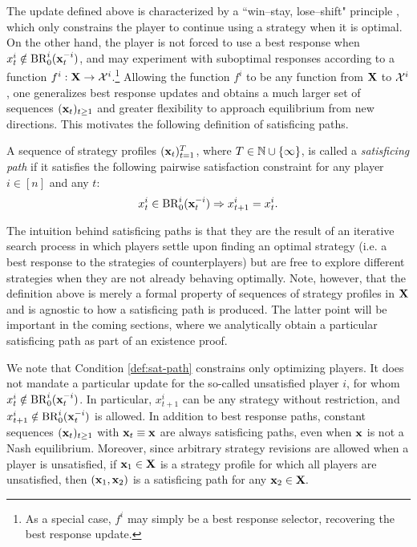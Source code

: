 The update defined above is characterized by a ``win--stay, lose--shift" principle \cite{chasparis2013aspiration, posch1999win}, which only constrains the player to continue using a strategy when it is optimal. On the other hand, the player is not forced to use a best response when $x^i_t \notin {\rm BR}^i_0 ( {\mathbf{x}}^{-i}_t )$, and may experiment with suboptimal responses according to a function $f^i : {\mathbf{X}} \to \mathcal{X}^i$.\footnote{As a special case, $f^i$ may simply be a best response selector, recovering the best response update.} Allowing the function $f^i$ to be any function from ${\mathbf{X}}$ to $\mathcal{X}^i$, one generalizes best response updates and obtains a much larger set of sequences $({\mathbf{x}}_t)_{t \geq 1}$ and greater flexibility to approach equilibrium from new directions. This motivates the following definition of satisficing paths.

\begin{definition}
    A sequence of strategy profiles $( {\mathbf{x}}_t )_{t = 1}^T$, where $T \in \mathbb{N} \cup \{ \infty\}$, is called a \emph{satisficing path} if it satisfies the following pairwise satisfaction constraint for any player $i \in [n]$ and any $t$:
        \begin{equation}
        x^i_t \in {\rm BR}^i_{0} ( {\mathbf{x}}^{-i}_t ) \Rightarrow x^i_{t+1} = x^i_t .  \label{def:sat-path}
        \end{equation}
\end{definition}

The intuition behind satisficing paths is that they are the result of an iterative search process in which players settle upon finding an optimal strategy (i.e. a best response to the strategies of counterplayers) but are free to explore different strategies when they are not already behaving optimally.  Note, however, that the definition above is merely a formal property of sequences of strategy profiles in ${\mathbf{X}}$ and is agnostic to how a satisficing path is produced. The latter point will be important in the coming sections, where we analytically obtain a particular satisficing path as part of an existence proof.



We note that Condition \eqref{def:sat-path} constrains only optimizing players. It does not mandate a particular update for the so-called unsatisfied player $i$, for whom $x^i_t \notin {\rm BR}^i_0 ( {\mathbf{x}}^{-i}_t )$. In particular, $x^i_{t+1}$ can be any strategy without restriction, and $x^i_{t+1} \notin {\rm BR}^i_0 ({\mathbf{x}}^{-i}_t)$ is allowed. In addition to best response paths, constant sequences $({\mathbf{x}}_t)_{t \geq 1}$ with ${\mathbf{x}}_t \equiv {\mathbf{x}}$ are always satisficing paths, even when ${\mathbf{x}}$ is not a Nash equilibrium. Moreover, since arbitrary strategy revisions are allowed when a player is unsatisfied, if ${\mathbf{x}}_1 \in {\mathbf{X}}$ is a strategy profile for which all players are unsatisfied, then $({\mathbf{x}}_1, {\mathbf{x}}_2)$ is a satisficing path for any ${\mathbf{x}}_2 \in {\mathbf{X}}.$





